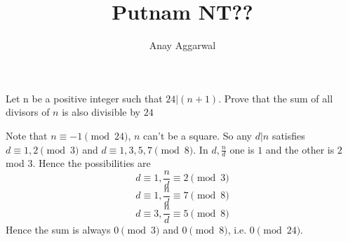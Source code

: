 \documentclass[11pt]{article}
\title{Putnam NT??}
\author{Anay Aggarwal}
\begin{document}
\maketitle
\begin{example}
Let n be a positive integer such that $24|(n+1)$. Prove that the sum
of all divisors of $n$ is also divisible by $24$
\end{example}
\begin{soln}
  Note that $n\equiv -1\pmod{24}$, $n$ can't be a square. So any $d|n$ satisfies $d\equiv 1,2\pmod{3}$
  and $d\equiv 1,3,5,7\pmod{8}$. In $d, \frac{n}{d}$ one is $1$ and the other is $2$ mod 3.
  Hence the possibilities are
  $$d\equiv 1, \frac{n}{d}\equiv 2\pmod{3}$$
  $$d\equiv 1, \frac{n}{d}\equiv 7\pmod{8}$$
  $$d\equiv 3, \frac{n}{d}\equiv 5\pmod{8}$$
  Hence the sum is always $0\pmod{3}$ and $0\pmod{8}$, i.e. $0\pmod{24}$.
\end{soln}
\end{document}
